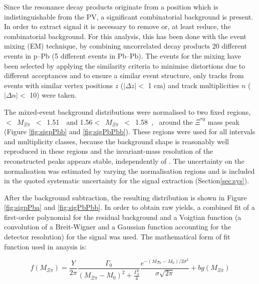 Since the resonance decay products originate from a position which is indistinguishable from the PV,
a significant combinatorial background is present. In order to extract \xis signal it is necessary to remove or, at least reduce, the combinatorial background. For this analysis, this has been done with the event mixing (EM) technique, by combining uncorrelated decay products  20 different events in p--Pb (5 different events in Pb--Pb). The events for the mixing have been selected by applying the similarity criteria to minimise distortions due to different acceptances and to ensure a similar event structure, only tracks from events with similar vertex positions $z$ ($|\Delta z| <$ 1 cm) and track multiplicities $n$ ($|\Delta n|<$ 10) were taken.

The mixed-event background distributions were normalised to two fixed regions, 
~$<$~$M_{\Xi\pi}$~$<$~1.51~\Gmass~and 1.56$<$~$M_{\Xi\pi}$~$<$~1.58~\Gmass,
~around the $\Xi^{*0}$ mass peak (Figure \ref{fig:sigpPbb} and \ref{fig:sigPbPbb}). These regions were used for all \pt intervals and multiplicity classes, because the background shape is reasonably well reproduced in these regions and the invariant-mass resolution of the reconstructed peaks appears stable, independently of \pt. The uncertainty on the normalisation was estimated by varying the normalisation regions and is included in the quoted systematic uncertainty for the signal extraction (Section\ref{sec:sys}).

After the background subtraction, the resulting distribution is shown in Figure \ref{fig:sigpPba} and \ref{fig:sigPbPbb}. In order to obtain raw yields, a combined fit of a first-order polynomial for the residual background and a Voigtian function (a convolution of a Breit-Wigner and a Gaussian function accounting for the detector resolution) for the signal was used. The mathematical form of fit function used in anaysis is: 

\begin{equation}
f(M_{\Xi\pi})= \frac{Y}{2\pi}  \frac{\Gamma_{0}}{(M_{\Xi\pi}-M_{0})^2+\frac{\Gamma_{0}^{2}}{4}} \frac{e^{-(M_{\Xi\pi}-M_{0})/2\sigma^{2}}}{\sigma\sqrt{2\pi}} + bg(M_{\Xi\pi})
\end{equation}


